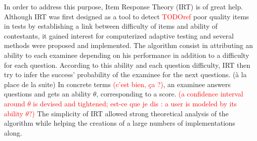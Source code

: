 \documentclass{sig-alternate}
\newcommand\alert[1]{\textcolor{red}{#1}}
\newcommand\jb[1]{\textcolor{green!50!black}{#1}}
\begin{document}
In order to address this purpose, Item Response Theory (IRT) is of great help. Although IRT was first designed as a tool to detect \alert{TODOref} poor quality items in tests by establishing a link between difficulty of items and ability of contestants, it gained interest for computerized adaptive testing and several methods were proposed and implemented. \jb{The algorithm consist in attributing an ability to each examinee depending on his performance in addition to a difficulty for each question. According to this ability and each question difficulty, IRT then try to infer the success' probability of the examinee for the next questions. (à la place de la suite)} In concrete terms \alert{(c'est bien, ça ?)}, an examinee answers questions and gets an ability $\theta$, corresponding to a score. \alert{(a confidence interval around $\theta$ is devised and tightened; est-ce que je dis : a user is modeled by its ability $\theta$?)} \jb{The simplicity of IRT allowed strong theoretical analysis of the algorithm while helping the creations of a large numbers of implementations along.} 
\end{document}
